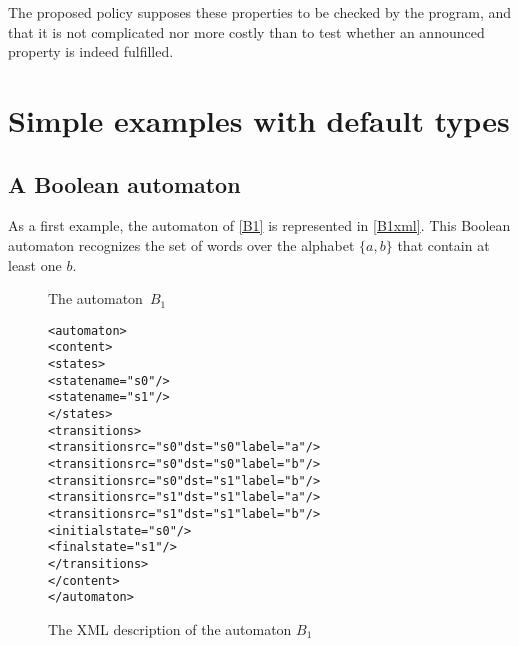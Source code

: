 \documentclass[a4paper]{article}
\newcommand{\medskipneg}{\vspace*{-2ex}} %
\def\dstname{\texttt{dst}}
\def\srcname{\texttt{src}}
\begin{document}
The proposed policy supposes these properties to be checked by the program, and that it is
not complicated nor more costly than to test whether an announced property is indeed fulfilled.

\section{Simple examples with default types}
\subsection{A Boolean automaton}

As a first example, the automaton of \autoref{B1} is represented in
\autoref{B1xml}. This Boolean automaton recognizes the set of
words over the alphabet $\{a,b\}$ that contain at least one $b$.\\

\begin{figure}[ht]
\begin{center}
\end{center}
\vspace*{-.8cm}
\caption{The automaton~$B_1$}\label{B1}
\medskipneg
\end{figure}

{\small

\begin{figure}[h]
  \begin{center}
\begin{alltt}
<automaton>
  <content>
    <states>
       <state name="s0"/>
       <state name="s1"/>
    </states>
    <transitions>
       <transition \srcname{}="s0" \dstname{}="s0" label="a"/>
       <transition \srcname{}="s0" \dstname{}="s0" label="b"/>
       <transition \srcname{}="s0" \dstname{}="s1" label="b"/>
       <transition \srcname{}="s1" \dstname{}="s1" label="a"/>
       <transition \srcname{}="s1" \dstname{}="s1" label="b"/>
       <initial state="s0"/>
       <final state="s1"/>
    </transitions>
  </content>
</automaton>
\end{alltt}

\caption{The XML description of the automaton $B_1$}
\label{B1xml}
  \end{center}
\end{figure}
}
\end{document}
